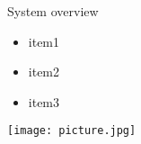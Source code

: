 \documentclass{beamer}
\begin{document}
  \begin{frame}[t]{System overview}
  \begin{minipage}{\textwidth}
    \begin{itemize}
      \item<1|only@1> item1
      \item<2|only@2> item2
      \item<3|only@3> item3
    \end{itemize}
  \end{minipage}
  \vfill
  \begin{minipage}{\textwidth}
    \centering
    \texttt{[image: picture.jpg]}
  \end{minipage}
  \end{frame}
\end{document}
